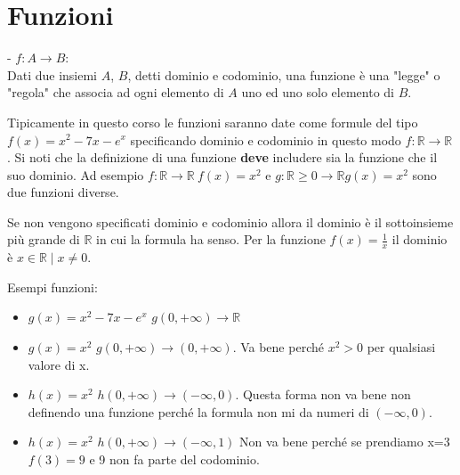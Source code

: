 \newpage
\section{Funzioni}
\begin{definition}[Funzione]
- $f: A \longrightarrow B$: \\
Dati due insiemi $A$, $B$, detti dominio e codominio, una funzione è una "legge" o "regola" che associa ad ogni elemento di $A$ uno ed uno solo elemento di $B$.
\end{definition}
\begin{note}
Tipicamente in questo corso le funzioni saranno date come formule del tipo $f(x) = x^2 - 7x - e^x$ specificando dominio e codominio in questo modo $f: \mathbb{R} \longrightarrow \mathbb{R}$. Si noti che la definizione di una funzione \textbf{deve} includere sia la funzione che il suo dominio. Ad esempio $f: \mathbb{R} \longrightarrow \mathbb{R} \: f(x)=x^2$ e $g: \mathbb{R} \geq 0 \longrightarrow \mathbb{R} g(x)=x^2$ sono due funzioni diverse.
\end{note}
\begin{note}
	Se non vengono specificati dominio e codominio allora il dominio è il sottoinsieme più grande di $\mathbb{R}$ in cui la formula ha senso. Per la funzione $f(x)=\frac{1}{x}$ il dominio è ${x \in \mathbb{R} \mid x \neq 0}$.
\end{note}
\begin{example}
    Esempi funzioni:
    \begin{itemize}
        \item $g(x) = x^2 - 7x - e^x$ \hspace{.3cm} $g(0,+\infty) \longrightarrow \mathbb{R}$
        \item $g(x) = x^2$ \hspace{.3cm} $g(0, +\infty) \longrightarrow (0, +\infty)$. \hspace{.3cm}Va bene perché $x^2 > 0$ per qualsiasi valore di x.
        \item $h(x) = x^2$ \hspace{.3cm} $h(0, +\infty) \longrightarrow (-\infty, 0)$. \hspace{.3cm}Questa forma non va bene non definendo una funzione perché la formula non mi da numeri di $(-\infty, 0)$.
        \item $h(x) = x^2$ \hspace{.3cm} $h(0, +\infty) \longrightarrow (-\infty,1)$ \hspace{.3cm}Non va bene perché se prendiamo x=3 $f(3) = 9$ e 9 non fa parte del codominio. 
    \end{itemize}
\end{example}

